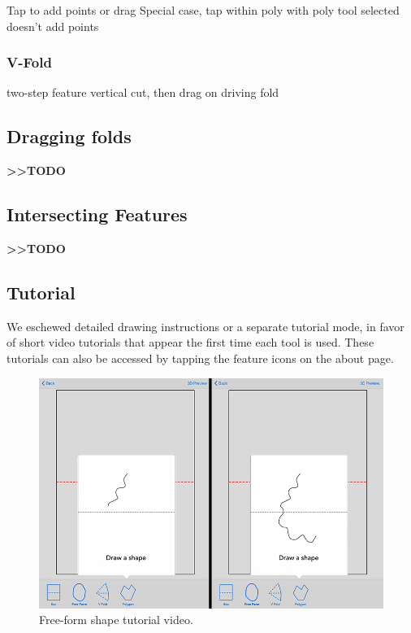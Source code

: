 Tap to add points or drag Special case, tap within poly with poly tool
selected doesn't add points

\subsubsection{V-Fold}\label{v-fold}

two-step feature vertical cut, then drag on driving fold

\subsection{Dragging folds}\label{dragging-folds}

\textbf{\textgreater{}\textgreater{}TODO}

\subsection{Intersecting Features}\label{intersecting-features}

\textbf{\textgreater{}\textgreater{}TODO}

\subsection{Tutorial}\label{tutorial}

We eschewed detailed drawing instructions or a separate tutorial mode,
in favor of short video tutorials that appear the first time each tool
is used. These tutorials can also be accessed by tapping the feature
icons on the about page.

\begin{figure}[htbp]
\centering
\includegraphics{figures/32_UI_Tool_Interactions/tutorial_step_one_two.png}
\caption{Free-form shape tutorial video.}
\end{figure}

